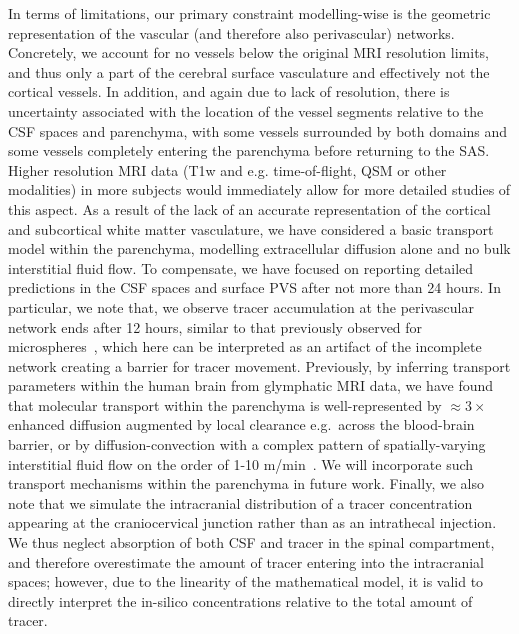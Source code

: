 \documentclass[fleqn,10pt]{wlscirep}
\begin{document}
In terms of limitations, our primary constraint modelling-wise is the
geometric representation of the vascular (and therefore also
perivascular) networks. Concretely, we account for no vessels below
the original MRI resolution limits, and thus only a part of the
cerebral surface vasculature and effectively not the cortical
vessels. In addition, and again due to lack of resolution, there is
uncertainty associated with the location of the vessel segments
relative to the CSF spaces and parenchyma, with some vessels
surrounded by both domains and some vessels completely entering the
parenchyma before returning to the SAS. Higher resolution MRI data
(T1w and e.g. time-of-flight, QSM or other modalities) in more
subjects would immediately allow for more detailed studies of this
aspect. As a result of the lack of an accurate representation of the
cortical and subcortical white matter vasculature, we have considered
a basic transport model within the parenchyma, modelling extracellular
diffusion alone and no bulk interstitial fluid flow. To compensate, we
have focused on reporting detailed predictions in the CSF spaces and
surface PVS after not more than 24 hours. In particular, we note that,
we observe tracer accumulation at the perivascular network ends after
12 hours, similar to that previously observed for
microspheres~\cite{bedussi2018paravascular, mestre2018flow}, which
here can be interpreted as an artifact of the incomplete network
creating a barrier for tracer movement. Previously, by inferring
transport parameters within the human brain from glymphatic MRI data,
we have found that molecular transport within the parenchyma is
well-represented by $\approx 3\times$ enhanced diffusion augmented by
local clearance e.g.~across the blood-brain barrier, or by
diffusion-convection with a complex pattern of spatially-varying
interstitial fluid flow on the order of 1-10 \textmu
m/min~\cite{vinje2023human}. We will incorporate such transport
mechanisms within the parenchyma in future work. Finally, we also note
that we simulate the intracranial distribution of a tracer
concentration appearing at the craniocervical junction rather than as
an intrathecal injection. We thus neglect absorption of both CSF and
tracer in the spinal compartment, and therefore overestimate the
amount of tracer entering into the intracranial spaces; however, due
to the linearity of the mathematical model, it is valid to directly
interpret the in-silico concentrations relative to the total amount of
tracer.
\end{document}
